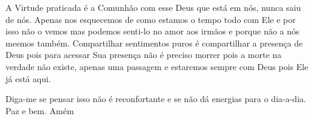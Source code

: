 \emdash{}A Virtude praticada é a Comunhão com esse Deus que está em nós, nunca saiu de nós. Apenas nos esquecemos de como estamos o tempo todo com Ele e por isso não o vemos mas podemos senti-lo no amor aos irmãos e porque não a nós mesmos também. Compartilhar sentimentos puros é compartilhar a presença de Deus pois para acessar Sua presença não é preciso morrer pois a morte na verdade não existe, apenas uma passagem e estaremos sempre com Deus pois Ele já está aqui.

\emdash{}Diga-me se pensar isso não é reconfortante e se não dá energias para o dia-a-dia. Paz e bem. Amém